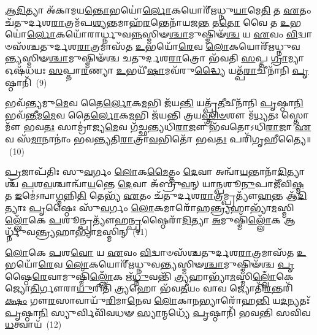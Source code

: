 {\anuvakamend[{𑌵𑌿𑌤᳴\-\ul{𑌤𑌾} 𑌤𑍍𑌰𑌿𑌚᳴𑌤𑍍𑌵𑌾𑌰𑌿𑍞𑌶𑌚𑍍𑌚}]}%

\-\ul{𑌆}\-\-\ul{𑌦𑌿}\-𑌤𑍍𑌯𑌾 𑌅᳴𑌕𑌾𑌮𑌯\-\ul{𑌨𑍍𑌤𑍋}\-𑌭𑌯𑍋॑\-\ul{𑌰𑍍𑌲𑍋}\-𑌕𑌯𑍋𑌰𑍍᳴𑌋𑌧𑍍𑌨𑍁\-\ul{𑌯𑌾}\-𑌮𑍇\-\ul{𑌤𑌿} 𑌤 \ul{𑌏}\-𑌤𑌂 𑌚᳴𑌤𑍁𑌰𑍍𑌦𑌶\-\ul{𑌰𑌾}\-𑌤𑍍𑌰𑌮᳴𑌪\-\ul{𑌶𑍍𑌯}\-𑌨𑍍𑌤𑌮𑌾𑌹᳴\-\ul{𑌰}\-𑌨𑍍𑌤𑍇𑌨𑌾᳴𑌯𑌜\-\ul{𑌨𑍍𑌤} 𑌤\-\ul{𑌤𑍋} 𑌵𑍈 𑌤 \ul{𑌉}\-𑌭𑌯𑍋॑\-\ul{𑌰𑍍𑌲𑍋}\-𑌕𑌯𑍋᳴𑌰𑌾𑌰𑍍𑌧𑍍𑌨𑍁𑌵\-\ul{𑌨𑍍𑌨}\-𑌸𑍍𑌮𑌿𑍟\-\ul{𑌶𑍍𑌚𑌾}\-𑌮𑍁𑌷𑍍𑌮𑌿𑍟᳴\-\ul{𑌶𑍍𑌚} 𑌯 \ul{𑌏}\-𑌵𑌂 \ul{𑌵𑌿}\-𑌦𑍍𑌵𑌾𑍞𑌸᳴𑌶𑍍𑌚𑌤𑍁𑌰𑍍𑌦𑌶\-\ul{𑌰𑌾}\-𑌤𑍍𑌰𑌮𑌾𑌸᳴𑌤 \ul{𑌉}\-𑌭𑌯𑍋᳴\-\ul{𑌰𑍇}\-𑌵 \ul{𑌲𑍋}\-𑌕𑌯𑍋𑌰𑍍\mbox{}᳴𑌋𑌧𑍍𑌨𑍁𑌵\-\ul{𑌨𑍍𑌤𑍍𑌯}\-\-𑌸𑍍𑌮𑌿𑍟\-\ul{𑌶𑍍𑌚𑌾}\-𑌮𑍁𑌷𑍍𑌮𑌿𑍟᳴𑌶𑍍𑌚 𑌚𑌤𑍁𑌰𑍍𑌦𑌶\-\ul{𑌰𑌾}\-𑌤𑍍𑌰𑍋 𑌭᳴𑌵𑌤𑌿 \ul{𑌸}\-𑌪𑍍𑌤 \ul{𑌗𑍍𑌰𑌾}\-𑌮𑍍𑌯𑌾 𑌓𑌷᳴𑌧𑌯𑌃 \ul{𑌸}\-𑌪𑍍𑌤𑌾\-\ul{𑌰}\-𑌣𑍍𑌯𑌾 \ul{𑌉}\-𑌭𑌯𑍀᳴\-\ul{𑌷𑌾}\-𑌮𑌵᳴𑌰𑍁\-\ul{𑌦𑍍𑌧𑍍𑌯𑍈} 𑌯𑌤𑍍𑌪᳴\-\ul{𑌰𑌾}\-𑌚𑍀𑌨𑌾᳴𑌨𑌿 \ul{𑌪𑍃}\-𑌷𑍍𑌠𑌾𑌨𑌿᳴~(9)

𑌭𑌵᳴\-\ul{𑌨𑍍𑌤𑍍𑌯}\-𑌮𑍁\-\ul{𑌮𑍇}\-𑌵 𑌤𑍈\-\ul{𑌰𑍍𑌲𑍋}\-𑌕\-\ul{𑌮}\-𑌭𑌿 𑌜᳴𑌯\-\ul{𑌨𑍍𑌤𑌿} 𑌯𑌤𑍍𑌪𑍍𑌰᳴\-\ul{𑌤𑍀}\-𑌚𑍀𑌨𑌾᳴𑌨𑌿 \ul{𑌪𑍃}\-𑌷𑍍𑌠𑌾\-\ul{𑌨𑌿} 𑌭𑌵᳴\-\ul{𑌨𑍍𑌤𑍀}\-𑌮\-\ul{𑌮𑍇}\-𑌵 𑌤𑍈\-\ul{𑌰𑍍𑌲𑍋}\-𑌕\-\ul{𑌮}\-𑌭𑌿 𑌜᳴𑌯𑌨𑍍𑌤𑌿 𑌤𑍍𑌰𑌯\-\ul{𑌸𑍍𑌤𑍍𑌰𑌿}\-\-\ul{𑍞}\-𑌶𑍗 𑌮᳴\-\ul{𑌧𑍍𑌯}\-𑌤𑌃 𑌸𑍍𑌤𑍋𑌮𑍗᳴ 𑌭𑌵\-\ul{𑌤𑌃} 𑌸𑌾𑌮𑍍𑌰𑌾॑𑌜𑍍𑌯\-\ul{𑌮𑍇}\-𑌵 𑌗᳴𑌚𑍍𑌛𑌨𑍍𑌤𑍍𑌯𑌧𑌿\-\ul{𑌰𑌾}\-𑌜𑍗 𑌭᳴𑌵𑌤𑍋\-𑌽𑌧𑌿\-\ul{𑌰𑌾}\-𑌜𑌾 \ul{𑌏}\-𑌵 𑌸᳴\-\ul{𑌮𑌾}\-𑌨𑌾𑌨𑌾𑌂॑ 𑌭𑌵𑌨𑍍𑌤𑍍𑌯𑌤𑌿\-\ul{𑌰𑌾}\-𑌤𑍍𑌰𑌾\-\ul{𑌵}\-𑌭𑌿𑌤𑍋᳴ 𑌭𑌵\-\ul{𑌤𑌃} 𑌪𑌰𑌿᳴𑌗𑍃𑌹𑍀𑌤𑍍𑌯𑍈॥~(10)

{\anuvakamend[{\-\ul{𑌪𑍃}\-𑌷𑍍𑌠𑌾\-\ul{𑌨𑌿} 𑌚𑌤𑍁᳴𑌸𑍍𑌤𑍍𑌰𑌿𑍞𑌶𑌚𑍍𑌚}]}%

\-\ul{𑌪𑍍𑌰}\-𑌜𑌾𑌪᳴𑌤𑌿𑌃 𑌸𑍁\-\ul{𑌵}\-𑌰𑍍𑌗𑌂 \ul{𑌲𑍋}\-𑌕\-\ul{𑌮𑍈}\-𑌤𑍍𑌤𑌂 \ul{𑌦𑍇}\-𑌵𑌾 𑌅𑌨𑍍𑌵𑌾᳴\-\ul{𑌯}\-𑌨𑍍𑌤𑌾𑌨𑌾᳴\-\ul{𑌦𑌿}\-𑌤𑍍𑌯𑌾𑌶𑍍𑌚᳴ \ul{𑌪}\-𑌶\-\ul{𑌵}\-𑌶𑍍𑌚𑌾𑌨𑍍𑌵𑌾᳴\-\ul{𑌯}\-𑌨𑍍𑌤𑍇 \ul{𑌦𑍇}\-𑌵𑌾 𑌅᳴𑌬𑍍𑌰𑍁\-\ul{𑌵}\-𑌨𑍍 𑌯𑌾\-\ul{𑌨𑍍𑌪}\-𑌶𑍂\-\ul{𑌨𑍁}\-𑌪𑌾𑌜𑍀᳴𑌵𑌿\-\ul{𑌷𑍍𑌮} 𑌤 \ul{𑌇}\-𑌮𑍇॑\-𑌽𑌨𑍍𑌵𑌾\-\ul{𑌗𑍍𑌮}\-𑌨𑍍𑌨𑌿\-\ul{𑌤𑌿} 𑌤𑍇𑌭𑍍𑌯᳴ \ul{𑌏}\-𑌤𑌂 𑌚᳴𑌤𑍁𑌰𑍍𑌦𑌶\-\ul{𑌰𑌾}\-𑌤𑍍𑌰𑌮𑍍𑌪𑍍𑌰𑌤𑍍𑌯𑍗᳴\-\ul{𑌹}\-𑌨𑍍𑌤 𑌆᳴\-\ul{𑌦𑌿}\-𑌤𑍍𑌯𑌾𑌃 \ul{𑌪𑍃}\-𑌷𑍍𑌠𑍈𑌃 𑌸𑍁᳴\-\ul{𑌵}\-𑌰𑍍𑌗𑌂 \ul{𑌲𑍋}\-𑌕𑌮𑌾𑌰𑍋᳴𑌹\-\ul{𑌨𑍍𑌤𑍍𑌰𑍍𑌯}\-𑌹𑌾𑌭𑍍𑌯𑌾᳴\-\ul{𑌮}\-𑌸𑍍𑌮𑌿\-\ul{𑌲𑍍𑌲𑍋𑌁}\-𑌕𑍇 \ul{𑌪}\-𑌶𑍂𑌨𑍍𑌪𑍍𑌰𑌤𑍍𑌯𑍗᳴𑌹\-\ul{𑌨𑍍𑌪𑍃}\-𑌷𑍍𑌠𑍈𑌰𑌾᳴\-\ul{𑌦𑌿}\-𑌤𑍍𑌯𑌾 \ul{𑌅}\-𑌮𑍁𑌷𑍍𑌮𑌿᳴\-\ul{𑌲𑍍𑌲𑍋𑌁}\-𑌕 𑌆𑌰𑍍𑌧𑍍𑌨𑍁᳴𑌵\-\ul{𑌨𑍍𑌤𑍍𑌰𑍍𑌯}\-𑌹𑌾𑌭𑍍𑌯𑌾᳴\-\ul{𑌮}\-𑌸𑍍𑌮𑌿𑌨𑍍~(11)

\-\ul{𑌲𑍋}\-𑌕𑍇 \ul{𑌪}\-𑌶\-\ul{𑌵𑍋} 𑌯 \ul{𑌏}\-𑌵𑌂 \ul{𑌵𑌿}\-𑌦𑍍𑌵𑌾𑍞𑌸᳴𑌶𑍍𑌚𑌤𑍁𑌰𑍍𑌦𑌶\-\ul{𑌰𑌾}\-𑌤𑍍𑌰𑌮𑌾𑌸᳴𑌤 \ul{𑌉}\-𑌭𑌯𑍋᳴\-\ul{𑌰𑍇}\-𑌵 \ul{𑌲𑍋}\-𑌕𑌯𑍋𑌰𑍍᳴𑌋𑌧𑍍𑌨𑍁𑌵\-\ul{𑌨𑍍𑌤𑍍𑌯}\-𑌸𑍍𑌮𑌿𑍟\-\ul{𑌶𑍍𑌚𑌾}\-𑌮𑍁𑌷𑍍𑌮𑌿𑍟᳴𑌶𑍍𑌚 \ul{𑌪𑍃}\-𑌷𑍍𑌠𑍈\-\ul{𑌰𑍇}\-𑌵𑌾𑌮𑍁𑌷𑍍𑌮𑌿᳴\-\ul{𑌲𑍍𑌲𑍋𑌁}\-𑌕 𑌋᳴\-\ul{𑌧𑍍𑌨𑍁}\-𑌵𑌨𑍍𑌤𑌿᳴ \ul{𑌤𑍍𑌰𑍍𑌯}\-𑌹𑌾𑌭𑍍𑌯𑌾᳴\-\ul{𑌮}\-𑌸𑍍𑌮𑌿\-\ul{𑌲𑍍𑌲𑍋𑌁}\-𑌕𑍇 𑌜𑍍𑌯𑍋\-\ul{𑌤𑌿}\-𑌰𑍍𑌗𑍗𑌰𑌾\-\ul{𑌯𑍁}\-𑌰𑌿𑌤𑌿᳴ \ul{𑌤𑍍𑌰𑍍𑌯}\-𑌹𑍋 𑌭᳴𑌵\-\ul{𑌤𑍀}\-𑌯𑌂 𑌵𑌾𑌵 𑌜𑍍𑌯𑍋𑌤𑌿᳴\-\ul{𑌰}\-𑌨𑍍𑌤𑌰𑌿᳴\-\ul{𑌕𑍍𑌷𑌂} 𑌗𑍗\-\ul{𑌰}\-𑌸𑌾𑌵𑌾𑌯𑍁᳴\-\ul{𑌰𑌿}\-𑌮𑌾\-\ul{𑌨𑍇}\-𑌵 \ul{𑌲𑍋}\-𑌕𑌾\-\ul{𑌨}\-𑌭𑍍𑌯𑌾𑌰𑍋᳴𑌹\-\ul{𑌨𑍍𑌤𑌿} 𑌯\-\ul{𑌦}\-𑌨𑍍𑌯𑌤𑌃᳴ \ul{𑌪𑍃}\-𑌷𑍍𑌠𑌾\-\ul{𑌨𑌿} 𑌸𑍍𑌯𑍁𑌰𑍍𑌵𑌿𑌵𑌿᳴𑌵𑌧𑍟 \ul{𑌸𑍍𑌯𑌾}\-𑌨𑍍𑌮𑌧𑍍𑌯𑍇᳴ \ul{𑌪𑍃}\-𑌷𑍍𑌠𑌾𑌨𑌿᳴ 𑌭𑌵𑌨𑍍𑌤𑌿 𑌸𑌵𑌿𑌵\-\ul{𑌧}\-𑌤𑍍𑌵𑌾𑌯᳴~(12)

